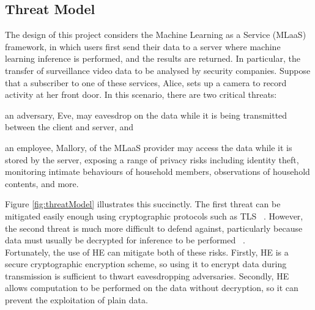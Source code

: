 \subsection{Threat Model}
\label{sec:threatModel}
\setlength{\leftskip}{0.5cm}
\indent \indent
The design of this project considers the Machine Learning as a Service (MLaaS) framework, in which users first send their data to a server where machine learning inference is performed, and the results are returned. In particular, the transfer of surveillance video data to be analysed by security companies. Suppose that a subscriber to one of these services, Alice, sets up a camera to record activity at her front door. In this scenario, there are two critical threats: 
\begin{enumerate*}[label=$(\roman*)$]
    \item an adversary, Eve, may eavesdrop on the data while it is being transmitted between the client and server, and 
    \item an employee, Mallory, of the MLaaS provider may access the data while it is stored by the server, exposing a range of privacy risks including identity theft, monitoring intimate behaviours of household members, observations of household contents, and more.
\end{enumerate*}
Figure \ref{fig:threatModel} illustrates this succinctly. The first threat can be mitigated easily enough using cryptographic protocols such as TLS ~\cite{TLS}. However, the second threat is much more difficult to defend against, particularly because data must usually be decrypted for inference to be performed ~\cite{Bae}.
\smallskip \\ \indent
Fortunately, the use of HE can mitigate both of these risks. Firstly, HE is a secure cryptographic encryption scheme, so using it to encrypt data during transmission is sufficient to thwart eavesdropping adversaries. Secondly, HE allows computation to be performed on the data without decryption, so it can prevent the exploitation of plain data.


